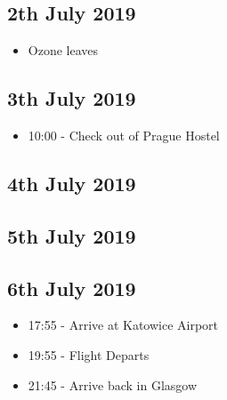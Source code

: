 \documentclass[a4paper,12pt]{article}
\begin{document}
\subsection*{2th July 2019}
     \begin{itemize}
 	\item Ozone leaves
 \end{itemize}
\subsection*{3th July 2019}
    \begin{itemize}
	   \item 10:00 - Check out of Prague Hostel
    \end{itemize} 

\subsection*{4th July 2019}
\subsection*{5th July 2019}
\subsection*{6th July 2019}
    \begin{itemize}
    	\item 17:55 - Arrive at Katowice Airport 
    	\item 19:55 - Flight Departs 
    	\item 21:45 - Arrive back in Glasgow
    \end{itemize}
\end{document}
